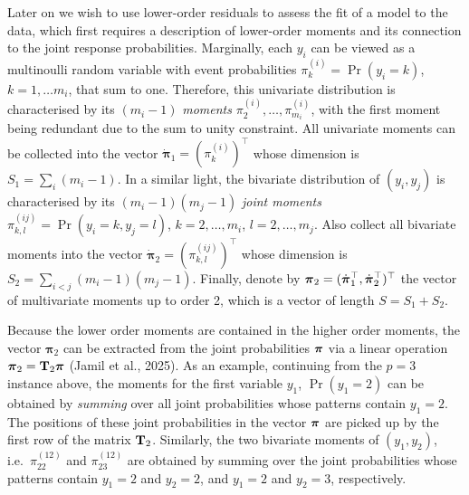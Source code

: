 \documentclass[
  letterpaper,
  DIV=11,
  numbers=noendperiod]{scrartcl}
\begin{document}
Later on we wish to use lower-order residuals to assess the fit of a
model to the data, which first requires a description of lower-order
moments and its connection to the joint response probabilities.
Marginally, each \(y_i\) can be viewed as a multinoulli random variable
with event probabilities \(\pi^{(i)}_k = \Pr(y_i = k)\),
\(k=1,\dots m_i\), that sum to one. Therefore, this univariate
distribution is characterised by its \((m_i-1)\) \emph{moments}
\(\pi^{(i)}_2,\dots,\pi^{(i)}_{m_i}\), with the first moment being
redundant due to the sum to unity constraint. All univariate moments can
be collected into the vector
\(\dot{\boldsymbol\pi}_1 = (\pi^{(i)}_k)^\top\) whose dimension is
\(S_1 = \sum_i (m_i-1)\). In a similar light, the bivariate distribution
of \((y_i, y_j)\) is characterised by its \((m_i-1)(m_j-1)\) \emph{joint
moments} \(\pi^{(ij)}_{k,l} = \Pr(y_i = k, y_j = l)\),
\(k=2,\dots,m_i\), \(l=2,\dots,m_j\). Also collect all bivariate moments
into the vector \(\dot{\boldsymbol\pi}_2 = (\pi^{(ij)}_{k,l})^\top\)
whose dimension is \(S_2 = \sum_{i<j} (m_i-1)(m_j-1)\). Finally, denote
by \(\boldsymbol\pi_2 = (\dot{{\boldsymbol\pi}}_1^\top, \dot{{\boldsymbol\pi}}_2^\top)^\top\) the
vector of multivariate moments up to order 2, which is a vector of
length \(S = S_1 + S_2\).

Because the lower order moments are contained in the higher order
moments, the vector \(\boldsymbol\pi_2\) can be extracted from the joint
probabilities \({\boldsymbol\pi}\) via a linear operation \({\boldsymbol\pi}_2 = {\mathbf T}_2 {\boldsymbol\pi}\)
(Jamil et al., 2025). As an example, continuing from the \(p=3\)
instance above, the moments for the first variable \(y_1\),
\(\Pr(y_1=2)\) can be obtained by \emph{summing} over all joint
probabilities whose patterns contain \(y_1=2\). The positions of these
joint probabilities in the vector \({\boldsymbol\pi}\) are picked up by the first
row of the matrix \({\mathbf T}_2\). Similarly, the two bivariate moments of
\((y_1,y_2)\), i.e.~\(\pi^{(12)}_{22}\) and \(\pi^{(12)}_{23}\) are
obtained by summing over the joint probabilities whose patterns contain
\(y_1=2\) and \(y_2=2\), and \(y_1=2\) and \(y_2=3\), respectively.
\end{document}
